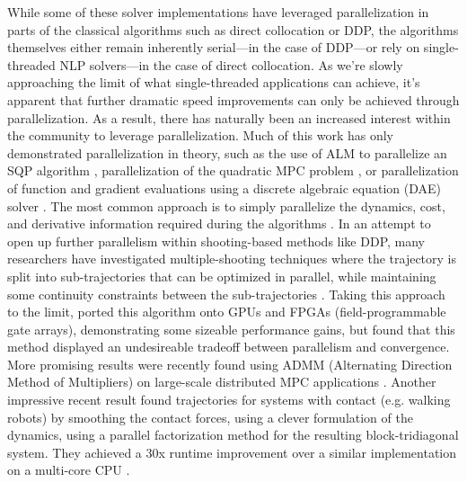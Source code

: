 \documentclass[../root.tex]{subfiles}
\begin{document}
While some of these solver implementations have leveraged parallelization in
parts of the classical algorithms such as direct collocation or DDP, the
algorithms themselves either remain inherently serial---in the case of DDP---or 
rely on single-threaded NLP solvers---in the case of direct collocation. As
we're slowly approaching the limit of what single-threaded applications can
achieve, it's apparent that further dramatic speed improvements can only be
achieved through parallelization. As a result, there has naturally been an
increased interest within the community to leverage parallelization. Much of
this work has only demonstrated parallelization in theory, such as the use of
ALM to parallelize an SQP algorithm \cite{kouzoupis_block_2016},
parallelization of the quadratic MPC problem \cite{frasch_parallel_2015}, or
parallelization of function and gradient evaluations using a discrete
algebraic equation (DAE) solver \cite{leineweber_efficient_2003}. The most
common approach is to simply parallelize the dynamics, cost, and derivative
information required during the algorithms \cite{giftthaler_Family_2017,
mastalli_Crocoddyl_2019, antony_Rapid_2017, neunert_WholeBody_2018}. In an
attempt to open up further parallelism within shooting-based methods like
DDP, many researchers have investigated multiple-shooting techniques where
the trajectory is split into sub-trajectories that can be optimized in
parallel, while maintaining some continuity constraints between the
sub-trajectories \cite{bock_Multiple_1984,giftthaler_Family_2017}. Taking
this approach to the limit, \cite{plancher_Performance_2020} ported this
algorithm onto GPUs and FPGAs (field-programmable gate arrays), demonstrating
some sizeable performance gains, but found that this method displayed an
undesireable tradeoff between parallelism and convergence. More promising
results were recently found using ADMM (Alternating Direction Method of Multipliers)
on large-scale distributed MPC applications \cite{alonso_Effective_2021}.
Another impressive recent result found trajectories for systems with contact 
(e.g. walking robots) by smoothing the contact forces, using a clever formulation 
of the dynamics, using a parallel factorization method for the resulting 
block-tridiagonal system. They achieved a 30x runtime improvement over a
similar implementation on a multi-core CPU \cite{pan_GPUbased_2019}.
\end{document}
